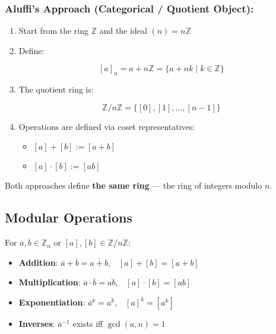 \documentclass[]{article}
\providecommand{\tightlist}{%
  \setlength{\itemsep}{0pt}\setlength{\parskip}{0pt}}
\begin{document}
\subsubsection{Aluffi's Approach (Categorical / Quotient
Object):}\label{aluffis-approach-categorical-quotient-object}

\begin{enumerate}
\def\labelenumi{\arabic{enumi}.}
\item
  Start from the ring \(\mathbb{Z}\) and the ideal \((n) = n\mathbb{Z}\)
\item
  Define:

  \[
  [a]_n = a + n\mathbb{Z} = \{ a + nk \mid k \in \mathbb{Z} \}
  \]
\item
  The quotient ring is:

  \[
  \mathbb{Z}/n\mathbb{Z} = \{ [0], [1], \dots, [n-1] \}
  \]
\item
  Operations are defined via coset representatives:

  \begin{itemize}
  \tightlist
  \item
    \([a] + [b] := [a + b]\)
  \item
    \([a] \cdot [b] := [ab]\)
  \end{itemize}
\end{enumerate}

Both approaches define \textbf{the same ring} --- the ring of integers
modulo \(n\).

\subsection{Modular Operations}\label{modular-operations}

For \(\overline{a}, \overline{b} \in \mathbb{Z}_n\) or
\([a], [b] \in \mathbb{Z}/n\mathbb{Z}\):

\begin{itemize}
\tightlist
\item
  \textbf{Addition}:
  $\overline{a} + \overline{b} = \overline{a + b}$, $[a] + [b] = [a + b]$
\item
  \textbf{Multiplication}:
  \( \overline{a} \cdot \overline{b} = \overline{ab}\), \([a] \cdot [b] = [ab]\)
\item
  \textbf{Exponentiation}:
  \( \overline{a}^k = \overline{a^k}\), \([a]^k = [a^k]\)
\item
  \textbf{Inverses}: \(\overline{a}^{-1}\) exists iff \(\gcd(a, n) = 1\)
\end{itemize}
\end{document}
